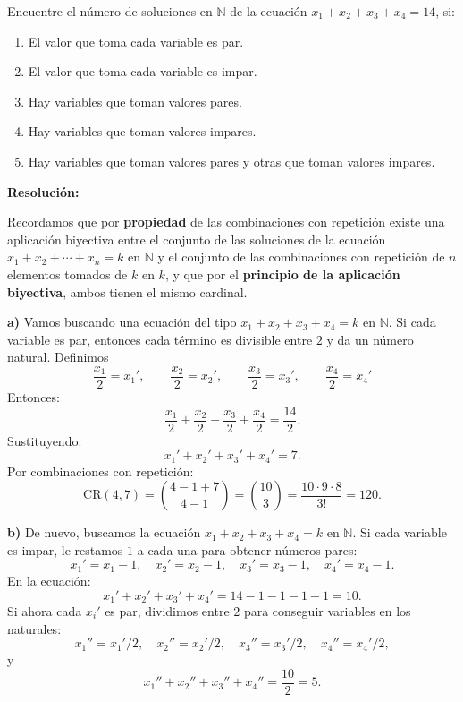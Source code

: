 \documentclass[a4paper,12pt]{article}
\begin{document}
\begin{ejercicio}[title=Ejercicio 34]
Encuentre el número de soluciones en $\mathbb{N}$ de la ecuación $x_1 + x_2 + x_3 + x_4 = 14$, si:

\begin{enumerate}
\item[a)] El valor que toma cada variable es par.
\item[b)] El valor que toma cada variable es impar.
\item[c)] Hay variables que toman valores pares.
\item[d)] Hay variables que toman valores impares.
\item[e)] Hay variables que toman valores pares y otras que toman valores impares.
\end{enumerate}

\tcblower
\textbf{Resolución:}

Recordamos que por \textbf{propiedad} de las combinaciones con repetición existe una aplicación biyectiva entre el conjunto de las soluciones de la ecuación $x_1+x_2+\cdots+x_n = k$ en $\mathbb{N}$ y el conjunto de las combinaciones con repetición de $n$ elementos tomados de $k$ en $k$, y que por el \textbf{principio de la aplicación biyectiva}, ambos tienen el mismo cardinal.

\bigskip

\textbf{a)}  
Vamos buscando una ecuación del tipo \(x_1+x_2+x_3+x_4 = k\) en \(\mathbb{N}\).  
Si cada variable es par, entonces cada término es divisible entre \(2\) y da un número natural.  
Definimos
\[
\frac{x_1}{2} = x_1', \qquad
\frac{x_2}{2} = x_2', \qquad
\frac{x_3}{2} = x_3', \qquad
\frac{x_4}{2} = x_4'
\]
Entonces:
\[
\frac{x_1}{2} + \frac{x_2}{2} + \frac{x_3}{2} + \frac{x_4}{2} = \frac{14}{2}.
\]
Sustituyendo:
\[
x_1' + x_2' + x_3' + x_4' = 7.
\]
Por combinaciones con repetición:
\[
\mathrm{CR}(4,7)=\binom{4-1+7}{4-1}=\binom{10}{3}=\frac{10\cdot9\cdot8}{3!}=\boxed{120}.
\]

\bigskip

\textbf{b)}  
De nuevo, buscamos la ecuación \(x_1+x_2+x_3+x_4 = k\) en \(\mathbb{N}\).  
Si cada variable es impar, le restamos \(1\) a cada una para obtener números pares:
\[
x_1' = x_1-1,\quad x_2' = x_2-1,\quad x_3' = x_3-1,\quad x_4' = x_4-1.
\]
En la ecuación:
\[
x_1' + x_2' + x_3' + x_4' = 14 - 1 - 1 - 1 - 1 = 10.
\]
Si ahora cada \(x_i'\) es par, dividimos entre \(2\) para conseguir variables en los naturales:
\[
x_1'' = x_1'/2,\quad x_2'' = x_2'/2,\quad x_3'' = x_3'/2,\quad x_4'' = x_4'/2,
\]
y
\[
x_1'' + x_2'' + x_3'' + x_4'' = \frac{10}{2} = 5.
\]
\end{ejercicio}
\end{document}
